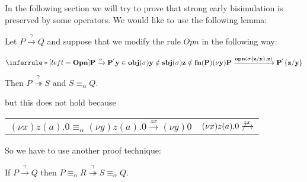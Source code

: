 
In the following section we will try to prove that strong early bisimulation is preserved by some operators. We would like to use the following lemma:
\begin{example}
  Let $P \xrightarrow{\gamma} Q$ and suppose that we modify the rule $Opn$ in the following way:
  \begin{center}
	  $\inferrule* [left=\bf{Opn}]{
	      P \xrightarrow{\sigma} P^{'}
	    \\
	      y \in obj(\sigma)
	    \\
	      y \notin sbj(\sigma)
	    \\
	      z \notin fn(P)
	  }{
	    (\nu y)P \xrightarrow{opn(\sigma\{z/y\}, z)} P^{'}\{z/y\}
	  }$    
  \end{center}
  Then $P \stackrel{\gamma}{\twoheadrightarrow} S$ and $S\equiv_{\alpha} Q$.
\end{example}
but this does not hold because
\begin{center}
  \begin{tabular}{ll}
      $(\nu x) z(a).0 \equiv_{\alpha} (\nu y) z(a).0 \xrightarrow{zx} (\nu y)0$
    &
      $(\nu x) z(a).0 \not \xrightarrow{zx} $
  \end{tabular}
\end{center}

So we have to use another proof technique:
\begin{lemma}\label{multipiOutMoveAlpDown}
  If $P \xrightarrow{\gamma} Q$ then $P\equiv_{\alpha}R \stackrel{\gamma}{\twoheadrightarrow} S\equiv_{\alpha}Q$.
\end{lemma}


